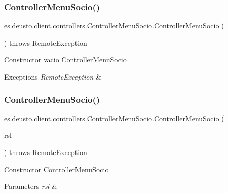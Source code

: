 \subsubsection{\texorpdfstring{ControllerMenuSocio()}{ControllerMenuSocio()}\hspace{0.1cm}{\footnotesize\ttfamily [1/2]}}
{\footnotesize\ttfamily es.\+deusto.\+client.\+controllers.\+Controller\+Menu\+Socio.\+Controller\+Menu\+Socio (\begin{DoxyParamCaption}{ }\end{DoxyParamCaption}) throws Remote\+Exception}

Constructor vacio \mbox{\hyperlink{classes_1_1deusto_1_1client_1_1controllers_1_1_controller_menu_socio}{Controller\+Menu\+Socio}} 
\begin{DoxyExceptions}{Exceptions}
{\em Remote\+Exception} & \\
\hline
\end{DoxyExceptions}
\mbox{\label{classes_1_1deusto_1_1client_1_1controllers_1_1_controller_menu_socio_a405a1354ffbd5cc5a2f2a9d0416b375f}} 
\subsubsection{\texorpdfstring{ControllerMenuSocio()}{ControllerMenuSocio()}\hspace{0.1cm}{\footnotesize\ttfamily [2/2]}}
{\footnotesize\ttfamily es.\+deusto.\+client.\+controllers.\+Controller\+Menu\+Socio.\+Controller\+Menu\+Socio (\begin{DoxyParamCaption}\item[{\mbox{\hyperlink{classes_1_1deusto_1_1client_1_1remote_1_1_service_locator}{Service\+Locator}}}]{rsl }\end{DoxyParamCaption}) throws Remote\+Exception}

Constructor \mbox{\hyperlink{classes_1_1deusto_1_1client_1_1controllers_1_1_controller_menu_socio}{Controller\+Menu\+Socio}} 
\begin{DoxyParams}{Parameters}
{\em rsl} & \\
\hline
\end{DoxyParams}

